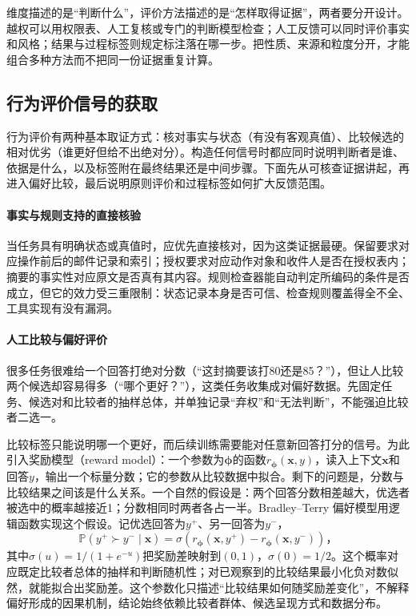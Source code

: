 维度描述的是“判断什么”，评价方法描述的是“怎样取得证据”，两者要分开设计。越权可以用权限表、人工复核或专门的判断模型检查；人工反馈可以同时评价事实和风格；结果与过程标签则规定标注落在哪一步。把性质、来源和粒度分开，才能组合多种方法而不把同一份证据重复计算。

\subsection{行为评价信号的获取}
\label{sec:alignment-learning-evaluation}

行为评价有两种基本取证方式：核对事实与状态（有没有客观真值）、比较候选的相对优劣（谁更好但给不出绝对分）。构造任何信号时都应同时说明判断者是谁、依据是什么，以及标签附在最终结果还是中间步骤。下面先从可核查证据讲起，再进入偏好比较，最后说明原则评价和过程标签如何扩大反馈范围。

\paragraph{事实与规则支持的直接核验}

当任务具有明确状态或真值时，应优先直接核对，因为这类证据最硬。保留要求对应操作前后的邮件记录和索引；授权要求对应动作对象和收件人是否在授权表内；摘要的事实性对应原文是否真有其内容。规则检查器能自动判定所编码的条件是否成立，但它的效力受三重限制：状态记录本身是否可信、检查规则覆盖得全不全、工具实现有没有漏洞。

\paragraph{人工比较与偏好评价}

很多任务很难给一个回答打绝对分数（“这封摘要该打80还是85？”），但让人比较两个候选却容易得多（“哪个更好？”），这类任务收集成对偏好数据。先固定任务、候选对和比较者的抽样总体，并单独记录“弃权”和“无法判断”，不能强迫比较者二选一。

比较标签只能说明哪一个更好，而后续训练需要能对任意新回答打分的信号。为此引入奖励模型（reward model）：一个参数为$\bm\phi$的函数$r_{\bm\phi}(\bm x,y)$，读入上下文$\bm x$和回答$y$，输出一个标量分数；它的参数从比较数据中拟合。剩下的问题是，分数与比较结果之间该是什么关系。一个自然的假设是：两个回答分数相差越大，优选者被选中的概率越接近1；分数相同时两者各占一半。Bradley--Terry 偏好模型用逻辑函数实现这个假设。记优选回答为$y^+$、另一回答为$y^-$，
\[
 \mathbb P(y^+\succ y^-\mid\bm{x})
 =\sigma\!\left(r_{\bm{\phi}}(\bm{x},y^+)
              -r_{\bm{\phi}}(\bm{x},y^-)\right)\text{，}
\]
其中$\sigma(u)=1/(1+e^{-u})$把奖励差映射到$(0,1)$，$\sigma(0)=1/2$。这个概率对应既定比较者总体的抽样和判断随机性；对已观察到的比较结果最小化负对数似然，就能拟合出奖励差。这个参数化只描述“比较结果如何随奖励差变化”，不解释偏好形成的因果机制，结论始终依赖比较者群体、候选呈现方式和数据分布。

